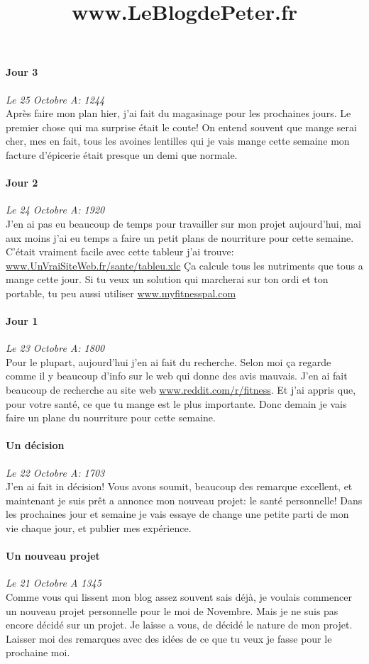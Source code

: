 \documentclass{article}
\begin{document}
\title{www.LeBlogdePeter.fr}


\paragraph{Jour 3} \emph{Le 25 Octobre A: 1244}\\
Après faire mon plan hier, j'ai fait du magasinage pour les prochaines jours. Le premier chose qui ma surprise était le coute! On entend souvent
que mange serai cher, mes en fait, tous les avoines lentilles qui je vais mange cette semaine mon facture d'épicerie était presque un demi 
que normale.

\paragraph{Jour 2} \emph{Le 24 Octobre A: 1920}\\
J'en ai pas eu beaucoup de temps pour travailler sur mon projet aujourd'hui, mai aux moins j'ai eu temps a faire un petit plans de nourriture
pour cette semaine. C'était vraiment facile avec cette tableur j'ai trouve: \underline{www.UnVraiSiteWeb.fr/sante/tableu.xlc} Ça calcule 
tous les nutriments que tous a mange cette jour. Si tu veux un solution qui marcherai sur ton ordi et ton portable, tu peu aussi utiliser 
\underline{www.myfitnesspal.com}

\paragraph{Jour 1} \emph{Le 23 Octobre A: 1800}\\
Pour le plupart, aujourd'hui j'en ai fait du recherche. Selon moi ça regarde comme il y beaucoup d'info sur le web qui donne des avis mauvais.
J'en ai fait beaucoup de recherche au site web \underline{www.reddit.com/r/fitness}. Et j'ai appris que, pour votre santé, ce que tu mange est
le plus importante. Donc demain je vais faire un plane du nourriture pour cette semaine.

\paragraph{Un décision} \emph{Le 22 Octobre A: 1703}\\
J'en ai fait in décision!  Vous avons soumit, beaucoup des remarque excellent, et maintenant je suis prêt a annonce mon nouveau projet: le santé personnelle! Dans les prochaines jour et semaine je vais essaye de change une petite parti de mon vie chaque jour, et publier mes expérience.

\paragraph{Un nouveau projet} \emph{Le 21 Octobre A 1345} \\
Comme vous qui lissent mon blog assez souvent sais déjà, je voulais commencer un nouveau projet personnelle pour le moi de Novembre. Mais je ne suis pas encore décidé sur un projet. Je laisse a vous, de décidé le nature de mon projet. Laisser moi des remarques avec des idées de ce que tu veux je fasse pour le prochaine moi.
\end{document}

